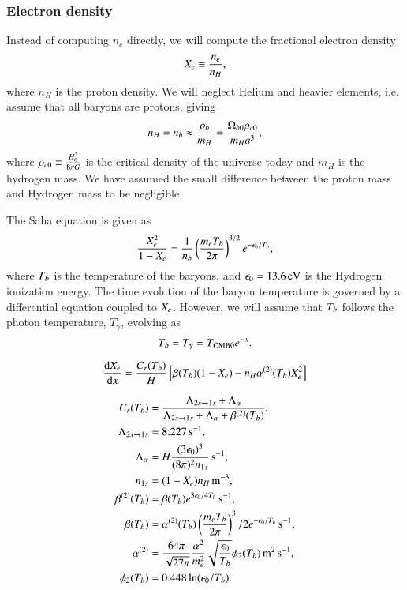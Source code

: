 \subsubsection{Electron density } \label{sssec:M2_electron_density}
Instead of computing $n_e$ directly, we will compute the fractional electron density
\begin{equation} \label{eq:M2:theory:X_e_definition}
    X_e \equiv \frac{n_e}{n_H},
\end{equation}
where $n_H$ is the proton density. We will neglect Helium and heavier elements, i.e. assume that all baryons are protons, giving  
\begin{equation} \label{eq:M2:theory:helium_baryon_number_density}
    n_H=n_b \approx \frac{\rho_b}{m_H} = \frac{\Omega_{b0} \rho_{c0}}{m_H a^3},
\end{equation}
where $\rho_{c0}\equiv \frac{ H_0^2}{8\pi G}$ is the critical density of the universe today and $m_H$ is the hydrogen mass. We have assumed the small difference between the proton mass and Hydrogen mass to be negligible.


The Saha equation is given as 
\begin{equation} \label{eq:M2:theory:saha_equation}
    \frac{X_e^2}{1-X_e} = \frac{1}{n_b} \left( \frac{m_e T_b}{2\pi} \right)^{3/2} e^{-\epsilon_0 / T_b},
\end{equation}
where $T_b$ is the temperature of the baryons, and $\epsilon_0=13.6\,\mathrm{eV}$ is the Hydrogen ionization energy. The time evolution of the baryon temperature is governed by a differential equation coupled to $X_e$. However, we will assume that $T_b$ follows the photon temperature, $T_\gamma$, evolving as 
\begin{equation}
    T_b = T_\gamma = T_\mathrm{CMB0} e^{-x}.
\end{equation}

\begin{equation}
    \dv{X_e}{x} = \frac{C_r(T_b)}{H}\left[ \beta(T_b)(1-X_e) - n_H \alpha^{(2)}(T_b) X_e^2  \right]
\end{equation}


\begin{align}
    C_r(T_b) &= \frac{\Lambda_{2s\to1s} + \Lambda_\alpha}{\Lambda_{2s\to1s} + \Lambda_\alpha + \beta^{(2)}(T_b)}, \\
    \Lambda_{2s\to1s} &= 8.227\,\mathrm{s^{-1}}, \\
    \Lambda_\alpha &= H \frac{(3\epsilon_0)^3}{(8\pi)^2 n_{1s}}\,\mathrm{s^{-1}}, \\
    n_{1s} &= (1-X_e) n_H \,\mathrm{m^{-3}}, \\
    \beta^{(2)}(T_b) &= \beta(T_b) e^{3\epsilon_0/4T_b} \,\mathrm{s^{-1}},\\
    \beta(T_b) &= \alpha^{(2)}(T_b) \left( \frac{m_e T_b}{2\pi} \right)^3/2 e^{-\epsilon_0/T_b} \,\mathrm{s^{-1}}, \\
    \alpha^{(2)} &= \frac{64\pi}{\sqrt{27\pi}} \frac{\alpha^2}{m_e^2} \sqrt{\frac{\epsilon_0}{T_b}} \phi_2(T_b)\,\mathrm{m^2\,s^{-1}}, \\
    \phi_2(T_b) &= 0.448\ln(\epsilon_0/T_b).
\end{align}

